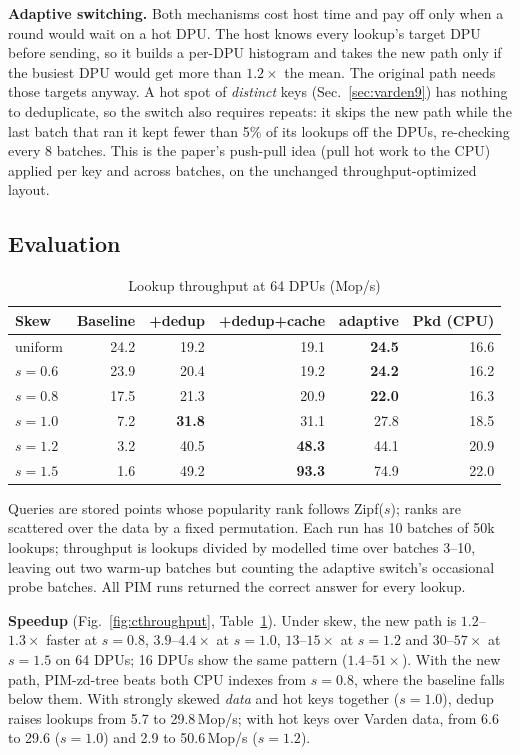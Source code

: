 \documentclass[conference]{IEEEtran}
\begin{document}
\textbf{Adaptive switching.} Both mechanisms cost host time and pay off only when a round would wait on a hot DPU.
The host knows every lookup's target DPU before sending, so it builds a per-DPU histogram and takes the new path only if
the busiest DPU would get more than $1.2\times$ the mean. The original path needs those targets anyway. A hot spot
of \emph{distinct} keys (Sec.~\ref{sec:varden9}) has nothing to deduplicate, so the switch also requires repeats: it
skips the new path while the last batch that ran it kept fewer than 5\% of its lookups off the DPUs, re-checking every
8 batches.
This is the paper's push-pull idea (pull hot work to the CPU) applied per key and across batches, on the unchanged
throughput-optimized layout.

\subsection{Evaluation}

\begin{table}[!t]
\caption{Lookup throughput at 64 DPUs (Mop/s)}
\label{tab:contrib}
\centering
\footnotesize
\setlength{\tabcolsep}{3.2pt}
\begin{tabular}{@{}lrrrrr@{}}
\toprule
Skew & Baseline & +dedup & +dedup+cache & adaptive & Pkd (CPU) \\
\midrule
uniform & 24.2 & 19.2 & 19.1 & \textbf{24.5} & 16.6 \\
$s{=}0.6$ & 23.9 & 20.4 & 19.2 & \textbf{24.2} & 16.2 \\
$s{=}0.8$ & 17.5 & 21.3 & 20.9 & \textbf{22.0} & 16.3 \\
$s{=}1.0$ & 7.2 & \textbf{31.8} & 31.1 & 27.8 & 18.5 \\
$s{=}1.2$ & 3.2 & 40.5 & \textbf{48.3} & 44.1 & 20.9 \\
$s{=}1.5$ & 1.6 & 49.2 & \textbf{93.3} & 74.9 & 22.0 \\
\bottomrule
\end{tabular}
\end{table}

Queries are stored points whose popularity rank follows Zipf($s$); ranks are scattered over the data by a fixed
permutation. Each run has 10 batches of 50k lookups; throughput is lookups divided by modelled time over batches
3--10, leaving out two warm-up batches but counting the adaptive switch's occasional probe batches. All PIM runs
returned the correct answer for every lookup.

\textbf{Speedup} (Fig.~\ref{fig:cthroughput}, Table~\ref{tab:contrib}). Under skew, the new path is
$1.2$--$1.3\times$ faster at $s{=}0.8$, $3.9$--$4.4\times$ at $s{=}1.0$, $13$--$15\times$ at $s{=}1.2$ and
$30$--$57\times$ at $s{=}1.5$ on 64 DPUs; 16 DPUs show the same pattern ($1.4$--$51\times$). With the new path,
PIM-zd-tree beats both CPU indexes from $s{=}0.8$, where the baseline falls below them. With strongly skewed
\emph{data} and hot keys together ($s{=}1.0$), dedup raises lookups from 5.7 to 29.8\,Mop/s; with hot keys over
Varden data, from 6.6 to 29.6 ($s{=}1.0$) and 2.9 to 50.6\,Mop/s ($s{=}1.2$).
\end{document}
